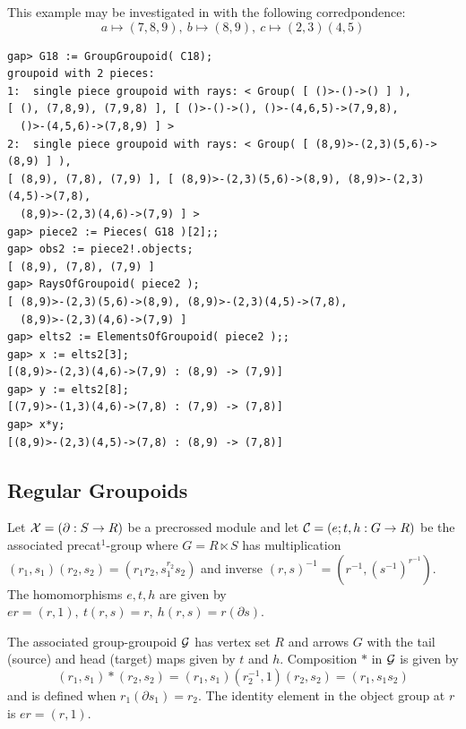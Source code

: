 \begin{example} \label{ex:G18}
This example may be investigated in {\GAP} with the following corredpondence:
$$
a \mapsto (7,8,9),~ b \mapsto (8,9),~ c \mapsto (2,3)(4,5)
$$

{\small 
\begin{verbatim}
gap> G18 := GroupGroupoid( C18);
groupoid with 2 pieces:
1:  single piece groupoid with rays: < Group( [ ()>-()->() ] ), 
[ (), (7,8,9), (7,9,8) ], [ ()>-()->(), ()>-(4,6,5)->(7,9,8), 
  ()>-(4,5,6)->(7,8,9) ] >
2:  single piece groupoid with rays: < Group( [ (8,9)>-(2,3)(5,6)->(8,9) ] ), 
[ (8,9), (7,8), (7,9) ], [ (8,9)>-(2,3)(5,6)->(8,9), (8,9)>-(2,3)(4,5)->(7,8),
  (8,9)>-(2,3)(4,6)->(7,9) ] >
gap> piece2 := Pieces( G18 )[2];;
gap> obs2 := piece2!.objects;
[ (8,9), (7,8), (7,9) ]
gap> RaysOfGroupoid( piece2 );
[ (8,9)>-(2,3)(5,6)->(8,9), (8,9)>-(2,3)(4,5)->(7,8), 
  (8,9)>-(2,3)(4,6)->(7,9) ]
gap> elts2 := ElementsOfGroupoid( piece2 );;
gap> x := elts2[3];
[(8,9)>-(2,3)(4,6)->(7,9) : (8,9) -> (7,9)]
gap> y := elts2[8];
[(7,9)>-(1,3)(4,6)->(7,8) : (7,9) -> (7,8)]
gap> x*y;
[(8,9)>-(2,3)(4,5)->(7,8) : (8,9) -> (7,8)]
\end{verbatim}} 
\end{example} 


\newpage
\subsection{Regular Groupoids} \label{subs:reggpd}  

Let $\mathcal{X} = (\partial : S \to R)$ be a precrossed module and let 
$\mathcal{C} = (e;t,h : G \to R)$ be the associated precat$^1$-group 
where $G = R \ltimes S$ 
has multiplication $(r_1,s_1)(r_2,s_2) = (r_1r_2,s_1^{r_2}s_2)$ 
and inverse $(r,s)^{-1} = (r^{-1},(s^{-1})^{r^{-1}})$. 
The homomorphisms $e,t,h$ are given by 
$er = (r,1),~ t(r,s) = r,~ h(r,s) = r(\partial s)$. 

The associated group-groupoid $\mathcal{G}$ has vertex set $R$ and arrows $G$ 
with the tail (source) and head (target) maps given by $t$ and $h$. 
Composition $*$ in $\mathcal{G}$ is given by 
$$
(r_1,s_1) * (r_2,s_2) = (r_1,s_1)(r_2^{-1},1)(r_2,s_2) = (r_1,s_1s_2) 
$$ 
and is defined when $r_1(\partial s_1) = r_2$. 
The identity element in the object group at $r$ is $er = (r,1)$. 

